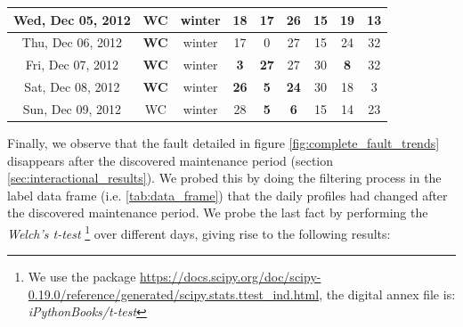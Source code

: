 \begin{table}[htbp]
\begin{tabular}{|c|c|c|c|c|c|c|c|c|}
    \hline
    \rowcolor[rgb]{ .988,  .835,  .706} Wed, Dec 05, 2012 & \textbf{WC} & winter & \textcolor[rgb]{ 1,  0,  0}{\textbf{18}} & \textcolor[rgb]{ 1,  0,  0}{\textbf{17}} & \textcolor[rgb]{ 1,  0,  0}{26} & \cellcolor[rgb]{ 1,  1,  1} 15 & \cellcolor[rgb]{ 1,  1,  1} 19 & \cellcolor[rgb]{ 1,  1,  1} 13 \bigstrut\\
    \hline
    \rowcolor[rgb]{ .988,  .835,  .706} Thu, Dec 06, 2012 & \textbf{WC} & winter & \cellcolor[rgb]{ 1,  1,  1} 17 & \cellcolor[rgb]{ 1,  1,  1} 0 & \cellcolor[rgb]{ 1,  1,  1} 27 & \cellcolor[rgb]{ 1,  1,  1} 15 & \cellcolor[rgb]{ 1,  1,  1} 24 & \cellcolor[rgb]{ 1,  1,  1} 32 \bigstrut\\
    \hline
    \rowcolor[rgb]{ .988,  .835,  .706} Fri, Dec 07, 2012 & \textbf{WC} & winter & \textcolor[rgb]{ 1,  0,  0}{\textbf{3}} & \textcolor[rgb]{ 1,  0,  0}{\textbf{27}} & \cellcolor[rgb]{ 1,  1,  1} 27 & \cellcolor[rgb]{ 1,  1,  1} 30 & \textcolor[rgb]{ 1,  0,  0}{\textbf{8}} & \cellcolor[rgb]{ 1,  1,  1} 32 \bigstrut\\
    \hline
    \rowcolor[rgb]{ .988,  .835,  .706} Sat, Dec 08, 2012 & \textbf{WC} & winter & \textcolor[rgb]{ 1,  0,  0}{\textbf{26}} & \textcolor[rgb]{ 1,  0,  0}{\textbf{5}} & \textcolor[rgb]{ 1,  0,  0}{\textbf{24}} & \cellcolor[rgb]{ 1,  1,  1} 30 & \cellcolor[rgb]{ 1,  1,  1} 18 & \cellcolor[rgb]{ 1,  1,  1} 3 \bigstrut\\
    \hline
    Sun, Dec 09, 2012 & WC   & winter & 28   & \cellcolor[rgb]{ .988,  .835,  .706} \textcolor[rgb]{ 1,  0,  0}{\textbf{5}} & \cellcolor[rgb]{ .988,  .835,  .706} \textcolor[rgb]{ 1,  0,  0}{\textbf{6}} & 15   & 14   & 23 \bigstrut\\
    \hline
    \end{tabular}%
  \label{tab:fault_dataframe}%
\end{table}%

Finally, we observe that the fault detailed in figure \ref{fig:complete_fault_trends} disappears after the discovered maintenance period (section \ref{sec:interactional_results}). 
We probed this by doing the filtering process in the label data frame (i.e. \ref{tab:data_frame}) that the daily profiles had changed after the discovered maintenance period. We probe the last fact by performing the \textit{Welch's t-test} \footnote{We use the package \url{https://docs.scipy.org/doc/scipy-0.19.0/reference/generated/scipy.stats.ttest_ind.html}, the digital annex file is: \textit{iPythonBooks/t-test}} over different days, giving rise to the following results:

